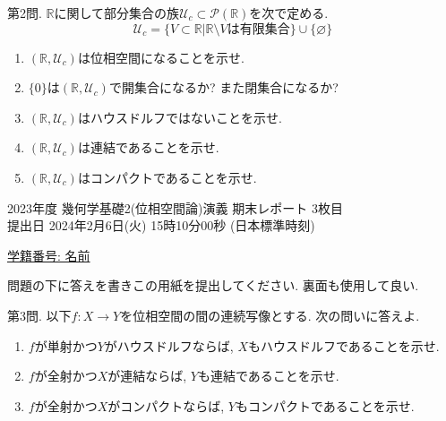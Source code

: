 \documentclass[dvipdfmx,a4paper,11pt]{article}
\newcommand{\R}{\mathbb{R}}
\theoremstyle{definition}
\begin{document}
 {\large 第2問.}  $\R$に関して部分集合の族$\mathscr{U}_c \subset \mathcal{P}(\R)$を次で定める.
$$
\mathscr{U}_c = \{V \subset \R | \text{$\R \setminus V$は有限集合} \} \cup \{  \varnothing  \}
$$
	\begin{enumerate}
	\setlength{\parskip}{0cm}
  	\setlength{\itemsep}{0pt} 
	\item $(\R,\mathscr{U}_c)$は位相空間になることを示せ.
	\item $\{ 0 \}$は$(\R,\mathscr{U}_c)$で開集合になるか? また閉集合になるか?
	\item $(\R,\mathscr{U}_c)$はハウスドルフではないことを示せ.
	\item $(\R,\mathscr{U}_c)$は連結であることを示せ.
	\item $(\R,\mathscr{U}_c)$はコンパクトであることを示せ. 
	\end{enumerate}

\newpage
\begin{center}
{\Large 2023年度 幾何学基礎2(位相空間論)演義 期末レポート 3枚目} \\

\vspace{5pt}
{ \large 提出日 2024年2月6日(火) 15時10分00秒 (日本標準時刻)}
\end{center}

\vspace{2pt}
\begin{flushleft}
{ \large \underline{学籍番号: \hspace{4cm} 名前  \hspace{8cm} } }
\end{flushleft}

\begin{center}
 {\large 問題の下に答えを書きこの用紙を提出してください. 裏面も使用して良い.}
  \end{center}
   {\large 第3問.}  以下$f : X \rightarrow Y$を位相空間の間の連続写像とする. 次の問いに答えよ.
	\begin{enumerate}
	\setlength{\parskip}{0cm}
  	\setlength{\itemsep}{0pt} 
	\item $f$が単射かつ$Y$がハウスドルフならば, $X$もハウスドルフであることを示せ. 
	\item $f$が全射かつ$X$が連結ならば, $Y$も連結であることを示せ. 
	\item $f$が全射かつ$X$がコンパクトならば, $Y$もコンパクトであることを示せ.
	\end{enumerate}
\end{document}
